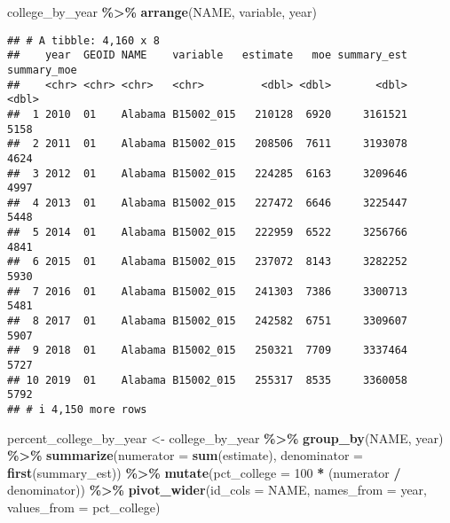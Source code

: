 \documentclass[
]{article}
\newenvironment{Shaded}{\begin{snugshade}}{\end{snugshade}}
\newcommand{\AttributeTok}[1]{\textcolor[rgb]{0.13,0.29,0.53}{#1}}
\newcommand{\DecValTok}[1]{\textcolor[rgb]{0.00,0.00,0.81}{#1}}
\newcommand{\FunctionTok}[1]{\textcolor[rgb]{0.13,0.29,0.53}{\textbf{#1}}}
\newcommand{\NormalTok}[1]{#1}
\newcommand{\OtherTok}[1]{\textcolor[rgb]{0.56,0.35,0.01}{#1}}
\newcommand{\SpecialCharTok}[1]{\textcolor[rgb]{0.81,0.36,0.00}{\textbf{#1}}}
\begin{document}
\begin{Shaded}
\begin{Highlighting}[]
\NormalTok{college\_by\_year }\SpecialCharTok{\%\textgreater{}\%} 
  \FunctionTok{arrange}\NormalTok{(NAME, variable, year)}
\end{Highlighting}
\end{Shaded}

\begin{verbatim}
## # A tibble: 4,160 x 8
##    year  GEOID NAME    variable   estimate   moe summary_est summary_moe
##    <chr> <chr> <chr>   <chr>         <dbl> <dbl>       <dbl>       <dbl>
##  1 2010  01    Alabama B15002_015   210128  6920     3161521        5158
##  2 2011  01    Alabama B15002_015   208506  7611     3193078        4624
##  3 2012  01    Alabama B15002_015   224285  6163     3209646        4997
##  4 2013  01    Alabama B15002_015   227472  6646     3225447        5448
##  5 2014  01    Alabama B15002_015   222959  6522     3256766        4841
##  6 2015  01    Alabama B15002_015   237072  8143     3282252        5930
##  7 2016  01    Alabama B15002_015   241303  7386     3300713        5481
##  8 2017  01    Alabama B15002_015   242582  6751     3309607        5907
##  9 2018  01    Alabama B15002_015   250321  7709     3337464        5727
## 10 2019  01    Alabama B15002_015   255317  8535     3360058        5792
## # i 4,150 more rows
\end{verbatim}

\begin{Shaded}
\begin{Highlighting}[]
\NormalTok{percent\_college\_by\_year }\OtherTok{\textless{}{-}}\NormalTok{ college\_by\_year }\SpecialCharTok{\%\textgreater{}\%}
  \FunctionTok{group\_by}\NormalTok{(NAME, year) }\SpecialCharTok{\%\textgreater{}\%}
  \FunctionTok{summarize}\NormalTok{(}\AttributeTok{numerator =} \FunctionTok{sum}\NormalTok{(estimate),}
            \AttributeTok{denominator =} \FunctionTok{first}\NormalTok{(summary\_est)) }\SpecialCharTok{\%\textgreater{}\%}
  \FunctionTok{mutate}\NormalTok{(}\AttributeTok{pct\_college =} \DecValTok{100} \SpecialCharTok{*}\NormalTok{ (numerator }\SpecialCharTok{/}\NormalTok{ denominator)) }\SpecialCharTok{\%\textgreater{}\%}
  \FunctionTok{pivot\_wider}\NormalTok{(}\AttributeTok{id\_cols =}\NormalTok{ NAME,}
              \AttributeTok{names\_from =}\NormalTok{ year,}
              \AttributeTok{values\_from =}\NormalTok{ pct\_college)}
\end{Highlighting}
\end{Shaded}
\end{document}
